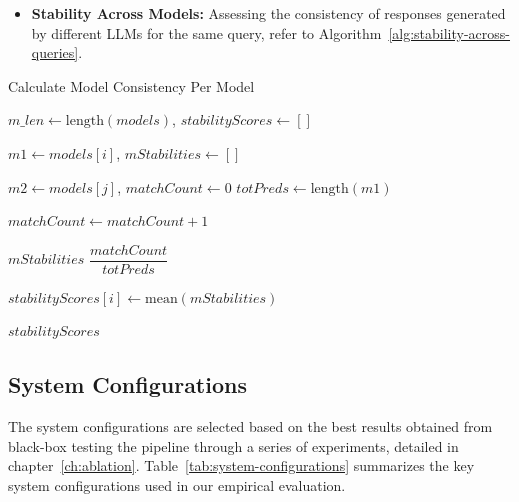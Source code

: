 \begin{itemize}
    \item \textbf{Stability Across Models:} Assessing the consistency of responses generated by different LLMs for the same query, refer to Algorithm~\ref{alg:stability-across-queries}.
\end{itemize}
\begin{algorithm}
    \footnotesize
    \caption{Calculate Model Consistency Per Model}
    \begin{algorithmic}[1]
         
            \State $m\_len \gets \text{length}(models)$, $stabilityScores \gets []$

                \State $m1 \gets models[i]$, $mStabilities \gets []$

                        \State $m2 \gets models[j]$, $matchCount \gets 0$
                        \State $totPreds \gets \text{length}(m1)$

                                \State $matchCount \gets matchCount + 1$
                            \EndIf
                        \EndFor

                        \State $mStabilities$ \gets $\dfrac{matchCount}{totPreds}$ 
                    \EndIf
                \EndFor

                \State $stabilityScores[i] \gets \text{mean}(mStabilities)$
            \EndFor

            \State \Return $stabilityScores$ 
        \EndProcedure
    \end{algorithmic}
    \label{alg:stability-across-queries}
\end{algorithm}

\subsection{System Configurations}\label{subsec:empirical-evaluation:experimental-setup:system-configurations}
The system configurations are selected based on the best results obtained from black-box testing the pipeline through a series of experiments, detailed in chapter~\ref{ch:ablation}.
Table~\ref{tab:system-configurations} summarizes the key system configurations used in our empirical evaluation.


